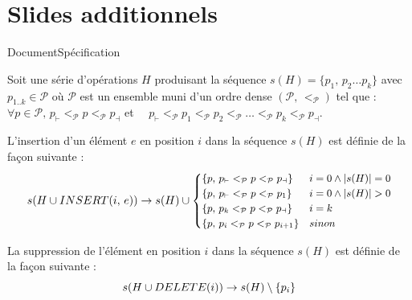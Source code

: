 
\section*{Slides additionnels}

\begin{frame}{Document}{Spécification}
  \begin{definition}
  Soit une série d'opérations $H$ produisant la séquence
  $s(H) = \{p_1,\, p_2 \ldots p_k\}$ avec $p_{1..k} \in \mathcal{P}$ où
  $\mathcal{P}$ est un ensemble muni d'un ordre
  dense $(\mathcal{P},\,<_\mathcal{P})$ tel que : \\
  $\forall p\in\mathcal{P},\, p_\vdash <_\mathcal{P} p <_\mathcal{P} p_\dashv $
  \hfill et \ \
  $p_\vdash <_\mathcal{P} p_1 <_\mathcal{P} p_2 <_\mathcal{P} \ldots
  <_\mathcal{P} p_k <_\mathcal{P} p_\dashv$.
  
  \vspace{0.25cm}

  \noindent L'insertion d'un élément $e$ en position $i$ dans la séquence $s(H)$
  est définie de la façon suivante :
  \begin{equation}
    \small
    s(H \cup INSERT(i,\, e)) \rightarrow s(H) \cup 
    \begin{cases}
      \{p,\, p_\vdash <_\mathcal{P} p <_\mathcal{P} p_\dashv \} & i = 0 \wedge |s(H)| = 0\\
      \{p,\, p_\vdash <_\mathcal{P} p <_\mathcal{P} p_1 \} & i = 0 \wedge |s(H)|>0\\
      \{p,\, p_k <_\mathcal{P} p <_\mathcal{P} p_\dashv \} & i = k\\
      \{p,\, p_i <_\mathcal{P} p <_\mathcal{P} p_{i+1} \} & sinon
    \end{cases}
  \end{equation}

  \noindent La suppression de l'élément en position $i$ dans la séquence $s(H)$
  est définie de la façon suivante :
  \begin{equation}
    \small
    s(H \cup DELETE(i)) \rightarrow s(H) \setminus \{ p_i \}
  \end{equation}
\end{definition}
\end{frame}


